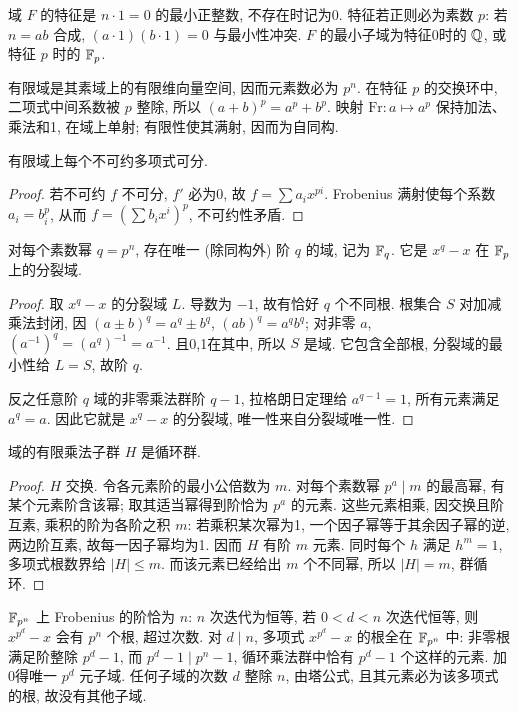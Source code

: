 \begin{definition}
域 $F$ 的特征是 $n\cdot1=0$ 的最小正整数, 不存在时记为0. 特征若正则必为素数 $p$: 若 $n=ab$ 合成, $(a\cdot1)(b\cdot1)=0$ 与最小性冲突. $F$ 的最小子域为特征0时的 $\mathbb Q$, 或特征 $p$ 时的 $\mathbb F_p$.
\end{definition}
有限域是其素域上的有限维向量空间, 因而元素数必为 $p^n$. 在特征 $p$ 的交换环中, 二项式中间系数被 $p$ 整除, 所以 $(a+b)^p=a^p+b^p$. 映射 $\mathrm{Fr}:a\mapsto a^p$ 保持加法、乘法和1, 在域上单射; 有限性使其满射, 因而为自同构.
\begin{proposition}
有限域上每个不可约多项式可分.
\end{proposition}
\begin{proof}
若不可约 $f$ 不可分, $f'$ 必为0, 故 $f=\sum a_ix^{pi}$. Frobenius 满射使每个系数 $a_i=b_i^p$, 从而 $f=(\sum b_ix^i)^p$, 不可约性矛盾.
\end{proof}
\begin{theorem}\label{thm:finitefield}
对每个素数幂 $q=p^n$, 存在唯一 (除同构外) 阶 $q$ 的域, 记为 $\mathbb F_q$. 它是 $x^q-x$ 在 $\mathbb F_p$ 上的分裂域.
\end{theorem}
\begin{proof}
取 $x^q-x$ 的分裂域 $L$. 导数为 $-1$, 故有恰好 $q$ 个不同根. 根集合 $S$ 对加减乘法封闭, 因 $(a\pm b)^q=a^q\pm b^q$, $(ab)^q=a^qb^q$; 对非零 $a$, $(a^{-1})^q=(a^q)^{-1}=a^{-1}$. 且0,1在其中, 所以 $S$ 是域. 它包含全部根, 分裂域的最小性给 $L=S$, 故阶 $q$.

反之任意阶 $q$ 域的非零乘法群阶 $q-1$, 拉格朗日定理给 $a^{q-1}=1$, 所有元素满足 $a^q=a$. 因此它就是 $x^q-x$ 的分裂域, 唯一性来自分裂域唯一性.
\end{proof}
\begin{theorem}\label{thm:finitecyclic}
域的有限乘法子群 $H$ 是循环群.
\end{theorem}
\begin{proof}
$H$ 交换. 令各元素阶的最小公倍数为 $m$. 对每个素数幂 $p^a\mid m$ 的最高幂, 有某个元素阶含该幂; 取其适当幂得到阶恰为 $p^a$ 的元素. 这些元素相乘, 因交换且阶互素, 乘积的阶为各阶之积 $m$: 若乘积某次幂为1, 一个因子幂等于其余因子幂的逆, 两边阶互素, 故每一因子幂均为1. 因而 $H$ 有阶 $m$ 元素. 同时每个 $h$ 满足 $h^m=1$, 多项式根数界给 $|H|\le m$. 而该元素已经给出 $m$ 个不同幂, 所以 $|H|=m$, 群循环.
\end{proof}
$\mathbb F_{p^n}$ 上 Frobenius 的阶恰为 $n$: $n$ 次迭代为恒等, 若 $0<d<n$ 次迭代恒等, 则 $x^{p^d}-x$ 会有 $p^n$ 个根, 超过次数. 对 $d\mid n$, 多项式 $x^{p^d}-x$ 的根全在 $\mathbb F_{p^n}$ 中: 非零根满足阶整除 $p^d-1$, 而 $p^d-1\mid p^n-1$, 循环乘法群中恰有 $p^d-1$ 个这样的元素. 加0得唯一 $p^d$ 元子域. 任何子域的次数 $d$ 整除 $n$, 由塔公式, 且其元素必为该多项式的根, 故没有其他子域.
